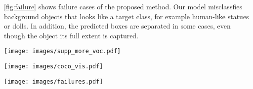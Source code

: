 \documentclass[runningheads]{llncs}
\begin{document}
\cref{fig:failure} shows failure cases of the proposed method. Our model misclassfies background objects that looks like a target class, for example human-like statues or dolls. In addition, the predicted boxes are separated in some cases, even though the object its full extent is captured.

\begin{figure*}[ht!]
\centering
\texttt{[image: images/supp\_more\_voc.pdf]}
\caption{More qualitative results for the three challenges of WSOD on VOC07.}
\label{fig:more_vis_voc}
\end{figure*}

\begin{comment}
\begin{figure*}[ht!]
\centering
\texttt{[image: images/supp\_more\_missing.pdf]}
\caption{Qualitative results for multiple instance labeling method on VOC07.}
\label{fig:more_vis_missing}
\end{figure*}
\end{comment}

\begin{figure*}[ht!]
\centering
\texttt{[image: images/coco\_vis.pdf]}
\caption{Qualitative results on COCO14.}
\label{fig:more_vis_coco}
\end{figure*}

\clearpage
\begin{figure*}[ht!]
\centering
\texttt{[image: images/failures.pdf]}
\caption{Failure cases of the proposed method.
}
\label{fig:failure}
\end{figure*}
\end{document}
